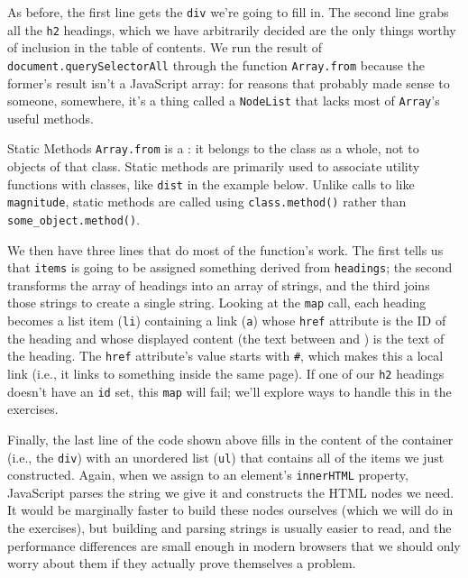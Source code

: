 \noindent
As before,
the first line gets the \texttt{div} we're going to fill in.
The second line grabs all the \texttt{h2} headings,
which we have arbitrarily decided are the only things worthy of inclusion
in the table of contents.
We run the result of \texttt{document.querySelectorAll}
through the function \texttt{Array.from}
because the former's result isn't a JavaScript array:
for reasons that probably made sense to someone, somewhere,
it's a thing called a \texttt{NodeList}
that lacks most of \texttt{Array}'s useful methods.

\begin{aside}{Static Methods}
  \texttt{Array.from} is a :
  it belongs to the class as a whole,
  not to objects of that class.
  Static methods are primarily used to associate utility functions with classes,
  like \texttt{dist} in the example below.
  Unlike calls to  like \texttt{magnitude},
  static methods are called using \texttt{class.method()}
  rather than \texttt{some\_object.method()}.
\end{aside}

We then have three lines that do most of the function's work.
The first tells us that \texttt{items} is going to be assigned
something derived from \texttt{headings};
the second transforms the array of headings into an array of strings,
and the third joins those strings to create a single string.
Looking at the \texttt{map} call,
each heading becomes a list item (\texttt{li})
containing a link (\texttt{a})
whose \texttt{href} attribute is the ID of the heading
and whose displayed content (the text between \texttt{} and \texttt{})
is the text of the heading.
The \texttt{href} attribute's value starts with \texttt{\#},
which makes this a local link
(i.e., it links to something inside the same page).
If one of our \texttt{h2} headings doesn't have an \texttt{id} set,
this \texttt{map} will fail;
we'll explore ways to handle this in the exercises.

Finally,
the last line of the code shown above
fills in the content of the container (i.e., the \texttt{div})
with an unordered list (\texttt{ul})
that contains all of the items we just constructed.
Again,
when we assign to an element's \texttt{innerHTML} property,
JavaScript parses the string we give it
and constructs the HTML nodes we need.
It would be marginally faster to build these nodes ourselves
(which we will do in the exercises),
but building and parsing strings is usually easier to read,
and the performance differences are small enough in modern browsers
that we should only worry about them if they actually prove themselves a problem.

